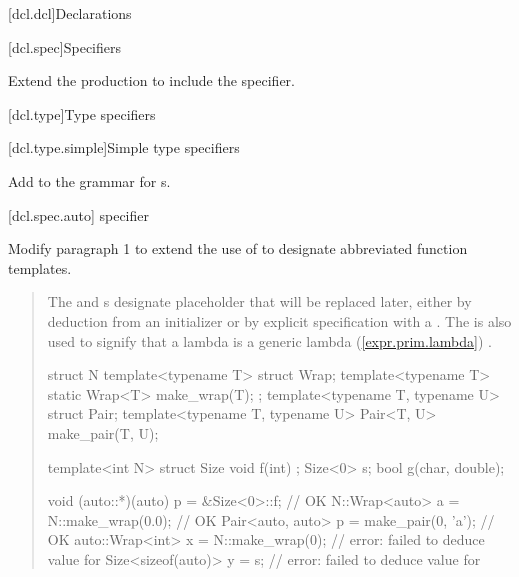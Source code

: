 
\setcounter{chapter}{6}
[dcl.dcl]{Declarations}


[dcl.spec]{Specifiers}

Extend the  production
to include the  specifier.

\begin{quote}
\begin{bnf}
\br
\end{bnf}
\end{quote}

\setcounter{subsection}{5}
[dcl.type]{Type specifiers}


\setcounter{subsubsection}{1}
[dcl.type.simple]{Simple type specifiers}
        
Add 
to the grammar for s.

\begin{quote}
\begin{bnf}
\br
\end{bnf}
\end{quote}

\setcounter{subsubsection}{3}
[dcl.spec.auto]{ specifier}

Modify paragraph 1 to extend the use of  to designate abbreviated 
function templates.

\begin{quote}
\pnum
The  and  s 
 designate  placeholder 
 that will be replaced later, either by deduction 
from an initializer or by explicit specification with a 
. 
%
The  
is also used to signify that a lambda is a 
generic lambda (\ref{expr.prim.lambda}) .
% 
\begin{addedblock}
\enterexample
\begin{codeblock}
struct N {
  template<typename T> struct Wrap;
  template<typename T> static Wrap<T> make_wrap(T);
};
template<typename T, typename U> struct Pair;
template<typename T, typename U> Pair<T, U> make_pair(T, U);

template<int N> struct Size { void f(int) { }  };
Size<0> s;
bool g(char, double);

void (auto::*)(auto) p = &Size<0>::f;   // OK
N::Wrap<auto> a = N::make_wrap(0.0);    // OK
Pair<auto, auto> p = make_pair(0, 'a'); // OK
auto::Wrap<int> x = N::make_wrap(0);    // error: failed to deduce value for 
Size<sizeof(auto)> y = s;               // error: failed to deduce value for 
\end{codeblock}
\exitexample
\end{addedblock}
\end{quote}

